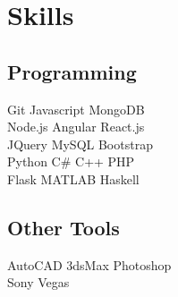 \documentclass[a4paper]{resume}
\begin{document}
\begin{minipage}[t]{0.33\textwidth}
\sectionspace %



\section{Skills}

\subsection{Programming}

Git \textbullet{} Javascript \textbullet{} MongoDB \\
Node.js \textbullet{} Angular \textbullet{}React.js \\
JQuery \textbullet{} MySQL \textbullet{} Bootstrap \\
Python \textbullet{} C\# \textbullet{} C++ \textbullet{} PHP \\
Flask \textbullet{} MATLAB \textbullet{} Haskell \\

\sectionspace %

\subsection{Other Tools}
AutoCAD \textbullet{} 3dsMax \textbullet{} Photoshop \\
Sony Vegas


\end{minipage} %
\hfill
%
%
\end{document}

